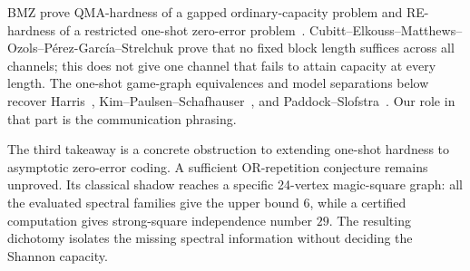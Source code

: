 \begin{remark}
BMZ prove QMA-hardness of a gapped ordinary-capacity problem and RE-hardness
of a restricted one-shot zero-error problem~\cite{BMZ}.
Cubitt--Elkouss--Matthews--Ozols--P\'erez-Garc\'ia--Strelchuk
\cite{CEMOPS} prove that no fixed block length suffices across all channels;
this does not give one channel that fails to attain capacity at every
length. The one-shot game-graph equivalences and model separations below
recover Harris~\cite{Harris}, Kim--Paulsen--Schafhauser~\cite{KPS}, and
Paddock--Slofstra~\cite{PS}. Our role in that part is the communication
phrasing.
\end{remark}

The third takeaway is a concrete obstruction to extending one-shot
hardness to asymptotic zero-error coding. A sufficient OR-repetition
conjecture remains unproved. Its classical shadow reaches a specific
24-vertex magic-square graph: all the evaluated spectral families give
the upper bound $6$, while a certified computation gives strong-square
independence number $29$. The resulting dichotomy isolates the missing
spectral information without deciding the Shannon capacity.
